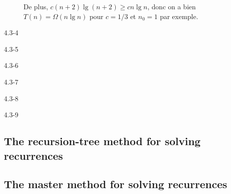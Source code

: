 \begin{description}
\begin{ex}
    De plus, $ c(n+2)\lg(n+2) \ge cn\lg n$, donc on a bien $T(n) = \Omega(n\lg n)$ pour $c = 1/3$ et $n_0 = 1$ par exemple.

  \end{ex}

  \item[4.3-4] {\itshape }

    \begin{exrev} 

    \end{exrev}

  \item[4.3-5] {\itshape }

    \begin{exrev}
      
    \end{exrev}

  \item[4.3-6] {\itshape }

    \begin{exrev}
      
    \end{exrev}

  \item[4.3-7] {\itshape }

    \begin{exrev}
      
    \end{exrev}

  \item[4.3-8] {\itshape }

    \begin{exrev}
      
    \end{exrev}

  \item[4.3-9] {\itshape }

    \begin{exrev}
      
    \end{exrev}

\end{description}

\subsection{The recursion-tree method for solving recurrences}

\subsection{The master method for solving recurrences}

